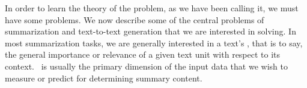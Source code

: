 In order to learn the theory of the problem, as we have been calling it, 
we must have some problems. We now describe some of the central problems
of summarization and text-to-text generation that we are interested in solving.
In most summarization tasks, we are generally interested in a text's
\textit{\salience}, that is to say, the general importance or relevance of a
given text unit with respect to its context. \Salience~is usually the primary
dimension of the input data that we wish to measure or predict for
determining summary content.  

